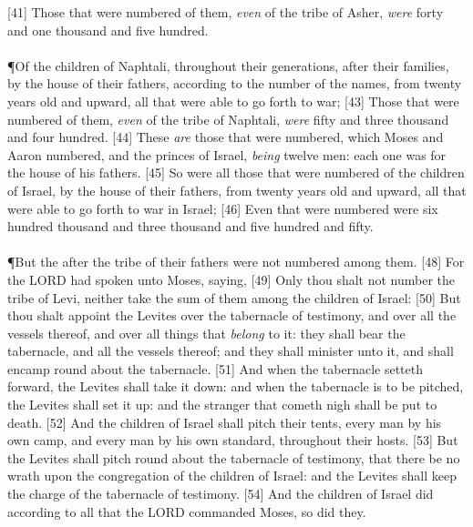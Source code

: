 [41] \textcolor[cmyk]{0.99998,1,0,0}{Those that were numbered of them, \emph{even} of the tribe of Asher, \emph{were} forty and one thousand and five hundred.}\\
\\
\P \textcolor[cmyk]{0.99998,1,0,0}{Of the children of Naphtali, throughout their generations, after their families, by the house of their fathers, according to the number of the names, from twenty years old and upward, all that were able to go forth to war;}
[43] \textcolor[cmyk]{0.99998,1,0,0}{Those that were numbered of them, \emph{even} of the tribe of Naphtali, \emph{were} fifty and three thousand and four hundred.}
[44] \textcolor[cmyk]{0.99998,1,0,0}{These \emph{are} those that were numbered, which Moses and Aaron numbered, and the princes of Israel, \emph{being} twelve men: each one was for the house of his fathers. }
[45] \textcolor[cmyk]{0.99998,1,0,0}{So were all those that were numbered of the children of Israel, by the house of their fathers, from twenty years old and upward, all that were able to go forth to war in Israel;}
[46] \textcolor[cmyk]{0.99998,1,0,0}{Even  that were numbered were six hundred thousand and three thousand and five hundred and fifty.}\\
\\
\P \textcolor[cmyk]{0.99998,1,0,0}{But the  after the tribe of their fathers were not numbered among them.}
[48] \textcolor[cmyk]{0.99998,1,0,0}{For the LORD had spoken unto Moses, saying,}
[49] \textcolor[cmyk]{0.99998,1,0,0}{Only thou shalt not number the tribe of Levi, neither take the sum of them among the children of Israel:}
[50] \textcolor[cmyk]{0.99998,1,0,0}{But thou shalt appoint the Levites over the tabernacle of testimony, and over all the vessels thereof, and over all things that \emph{belong} to it: they shall bear the tabernacle, and all the vessels thereof; and they shall minister unto it, and shall encamp round about the tabernacle.}
[51] \textcolor[cmyk]{0.99998,1,0,0}{And when the tabernacle setteth forward, the Levites shall take it down: and when the tabernacle is to be pitched, the Levites shall set it up: and the stranger that cometh nigh shall be put to death.}
[52] \textcolor[cmyk]{0.99998,1,0,0}{And the children of Israel shall pitch their tents, every man by his own camp, and every man by his own standard, throughout their hosts. }
[53] \textcolor[cmyk]{0.99998,1,0,0}{But the Levites shall pitch round about the tabernacle of testimony, that there be no wrath upon the congregation of the children of Israel: and the Levites shall keep the charge of the tabernacle of testimony.}
[54] \textcolor[cmyk]{0.99998,1,0,0}{And the children of Israel did according to all that the LORD commanded Moses, so did they.}